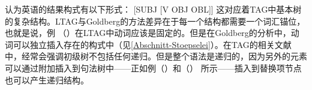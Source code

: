  \citet[]{Goldberg95a}认为英语的结果构式有以下形式：
\ea
{}[SUBJ [V OBJ OBL]] 
\z
这对应着TAG中基本树的复杂结构。LTAG与Goldberg的方法差异在于每一个结构都需要一个词汇锚位，也就是说，例 （）在LTAG中动词应该是固定的。但是在Goldberg的分析中，动词可以独立插入存在的构式中（见\ref{Abschnitt-Stoepselei}）。在TAG的相关文献中，经常会强调初级树不包括任何递归。但是整个语法是递归的，因为另外的元素可以通过附加插入到句法树中——正如例（）和（） 所示——插入到替换项节点也可以产生递归结构。



